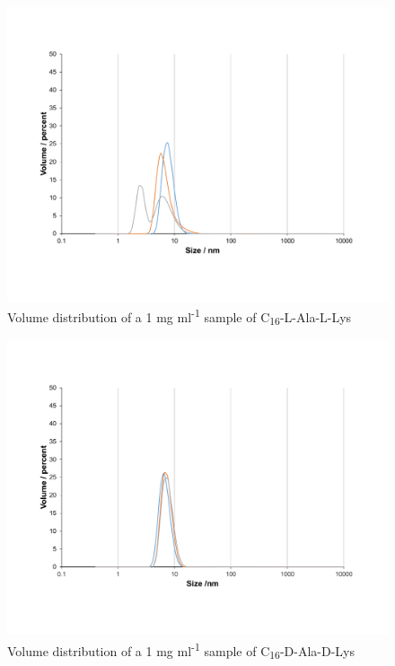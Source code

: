 \begin{figure} [ht!]
\centering
\includegraphics[scale=0.47]{DLS/KAT1_19_1_0mg_ml-1_volume.pdf}
\caption{Volume distribution of a 1 mg ml\textsuperscript{-1} sample of C\textsubscript{16}-L-Ala-L-Lys}
\label{volume_distribution_KAT1.19}
\end{figure}

\begin{figure} [ht!]
\centering
\includegraphics[scale=0.47]{DLS/KAT1_35_1_0mg_ml-1_volume.pdf}
\caption{Volume distribution of a 1 mg ml\textsuperscript{-1} sample of C\textsubscript{16}-D-Ala-D-Lys}
\label{volume_1.0_KAT1.35}
\end{figure}

